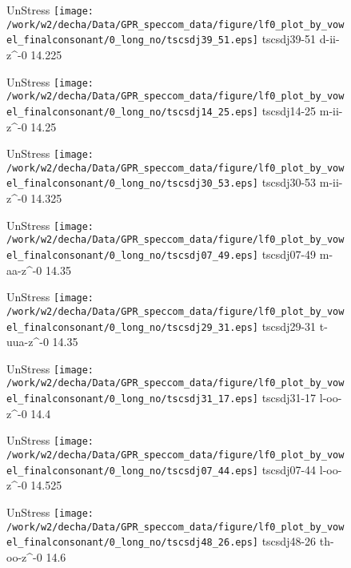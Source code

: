 \documentclass{article}
\begin{document}
\begin{figure}[t]
\begin{minipage}[b]{.24\textwidth}
UnStress
\centering
\texttt{[image: /work/w2/decha/Data/GPR\_speccom\_data/figure/lf0\_plot\_by\_vowel\_finalconsonant/0\_long\_no/tscsdj39\_51.eps]}
tscsdj39-51 d-ii-z\textasciicircum-0 14.225
\end{minipage}
\begin{minipage}[b]{.24\textwidth}
UnStress
\centering
\texttt{[image: /work/w2/decha/Data/GPR\_speccom\_data/figure/lf0\_plot\_by\_vowel\_finalconsonant/0\_long\_no/tscsdj14\_25.eps]}
tscsdj14-25 m-ii-z\textasciicircum-0 14.25
\end{minipage}
\begin{minipage}[b]{.24\textwidth}
UnStress
\centering
\texttt{[image: /work/w2/decha/Data/GPR\_speccom\_data/figure/lf0\_plot\_by\_vowel\_finalconsonant/0\_long\_no/tscsdj30\_53.eps]}
tscsdj30-53 m-ii-z\textasciicircum-0 14.325
\end{minipage}
\begin{minipage}[b]{.24\textwidth}
UnStress
\centering
\texttt{[image: /work/w2/decha/Data/GPR\_speccom\_data/figure/lf0\_plot\_by\_vowel\_finalconsonant/0\_long\_no/tscsdj07\_49.eps]}
tscsdj07-49 m-aa-z\textasciicircum-0 14.35
\end{minipage}
\end{figure}
\clearpage
\begin{figure}[t]
\begin{minipage}[b]{.24\textwidth}
UnStress
\centering
\texttt{[image: /work/w2/decha/Data/GPR\_speccom\_data/figure/lf0\_plot\_by\_vowel\_finalconsonant/0\_long\_no/tscsdj29\_31.eps]}
tscsdj29-31 t-uua-z\textasciicircum-0 14.35
\end{minipage}
\begin{minipage}[b]{.24\textwidth}
UnStress
\centering
\texttt{[image: /work/w2/decha/Data/GPR\_speccom\_data/figure/lf0\_plot\_by\_vowel\_finalconsonant/0\_long\_no/tscsdj31\_17.eps]}
tscsdj31-17 l-oo-z\textasciicircum-0 14.4
\end{minipage}
\begin{minipage}[b]{.24\textwidth}
UnStress
\centering
\texttt{[image: /work/w2/decha/Data/GPR\_speccom\_data/figure/lf0\_plot\_by\_vowel\_finalconsonant/0\_long\_no/tscsdj07\_44.eps]}
tscsdj07-44 l-oo-z\textasciicircum-0 14.525
\end{minipage}
\begin{minipage}[b]{.24\textwidth}
UnStress
\centering
\texttt{[image: /work/w2/decha/Data/GPR\_speccom\_data/figure/lf0\_plot\_by\_vowel\_finalconsonant/0\_long\_no/tscsdj48\_26.eps]}
tscsdj48-26 th-oo-z\textasciicircum-0 14.6
\end{minipage}
\end{figure}
\end{document}
